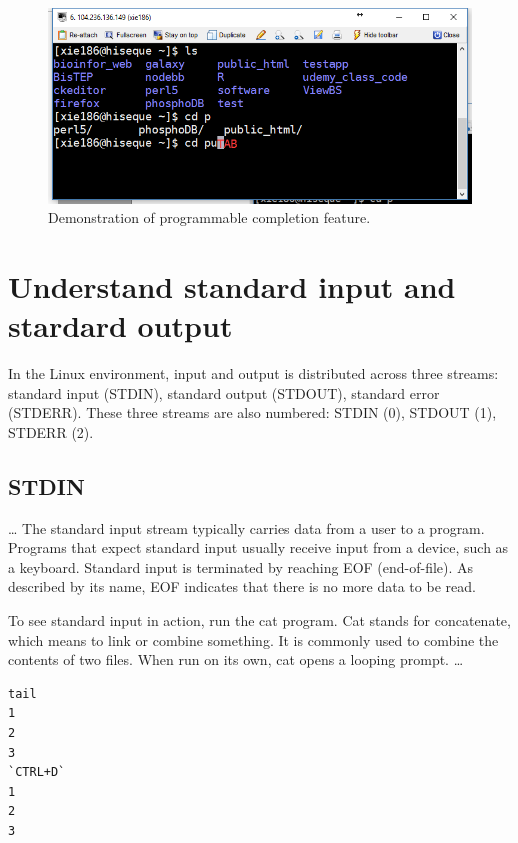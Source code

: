 \documentclass[]{book}
\begin{document}
\begin{figure}
\centering
\includegraphics{figures/linuxAutoCompletion.png}
\caption{\label{fig:linuxAutoCompletion}Demonstration of programmable completion feature.}
\end{figure}

\hypertarget{understand-standard-input-and-stardard-output}{%
\section{Understand standard input and stardard output}\label{understand-standard-input-and-stardard-output}}

In the Linux environment, input and output is distributed across three streams: standard input (STDIN), standard output (STDOUT), standard error (STDERR). These three streams are also numbered: STDIN (0), STDOUT (1), STDERR (2).

\hypertarget{stdin}{%
\subsection{STDIN}\label{stdin}}

\ldots{}
The standard input stream typically carries data from a user to a program. Programs that expect standard input usually receive input from a device, such as a keyboard. Standard input is terminated by reaching EOF (end-of-file). As described by its name, EOF indicates that there is no more data to be read.

To see standard input in action, run the cat program. Cat stands for concatenate, which means to link or combine something. It is commonly used to combine the contents of two files. When run on its own, cat opens a looping prompt.
\ldots{}

\begin{verbatim}
tail
1
2
3
`CTRL+D`
1
2
3
\end{verbatim}
\end{document}

